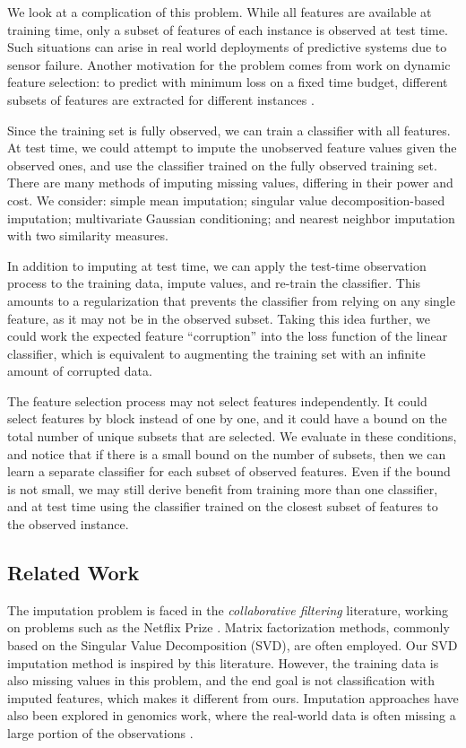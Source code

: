 We look at a complication of this problem.
While all features are available at training time, only a subset of features of each instance is observed at test time.
Such situations can arise in real world deployments of predictive systems due to sensor failure.
Another motivation for the problem comes from work on dynamic feature selection: to predict with minimum loss on a fixed time budget, different subsets of features are extracted for different instances \cite{Karayev-NIPS-2012, Xu-ICML-2013}.

Since the training set is fully observed, we can train a classifier with all features.
At test time, we could attempt to impute the unobserved feature values given the observed ones, and use the classifier trained on the fully observed training set.
There are many methods of imputing missing values, differing in their power and cost.
We consider: simple mean imputation; singular value decomposition-based imputation; multivariate Gaussian conditioning; and nearest neighbor imputation with two similarity measures.

In addition to imputing at test time, we can apply the test-time observation process to the training data, impute values, and re-train the classifier.
This amounts to a regularization that prevents the classifier from relying on any single feature, as it may not be in the observed subset.
Taking this idea further, we could work the expected feature ``corruption'' into the loss function of the linear classifier, which is equivalent to augmenting the training set with an infinite amount of corrupted data.

The feature selection process may not select features independently.
It could select features by block instead of one by one, and it could have a bound on the total number of unique subsets that are selected.
We evaluate in these conditions, and notice that if there is a small bound on the number of subsets, then we can learn a separate classifier for each subset of observed features.
Even if the bound is not small, we may still derive benefit from training more than one classifier, and at test time using the classifier trained on the closest subset of features to the observed instance.

\subsection{Related Work}
The imputation problem is faced in the \emph{collaborative filtering} literature, working on problems such as the Netflix Prize \cite{Koren-2009}.
Matrix factorization methods, commonly based on the Singular Value Decomposition (SVD), are often employed.
Our SVD imputation method is inspired by this literature.
However, the training data is also missing values in this problem, and the end goal is not classification with imputed features, which makes it different from ours.
Imputation approaches have also been explored in genomics work, where the real-world data is often missing a large portion of the observations \cite{Hastie-1999}.


